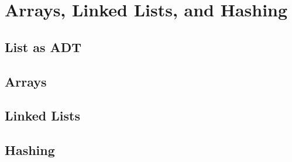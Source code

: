 \chapter{Arrays, Linked Lists, and Hashing}
\section{List as ADT}
\section{Arrays}
\section{Linked Lists}
\section{Hashing}